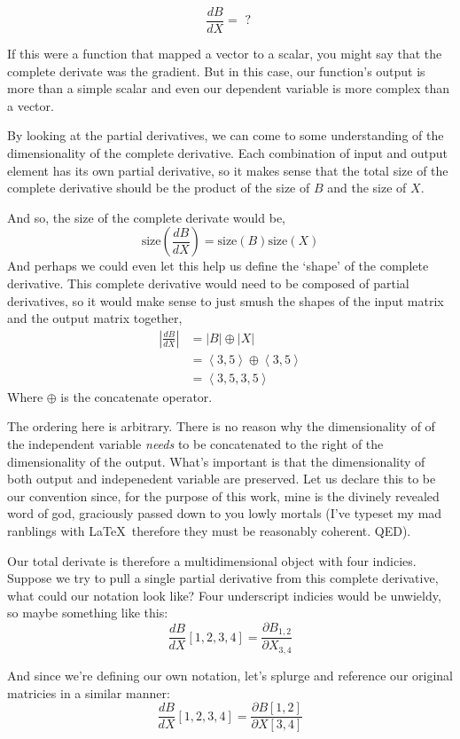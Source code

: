 \documentclass[12pt]{book}
\theoremstyle{definition}
\theoremstyle{plain}
\theoremstyle{ppart}
\theoremstyle{case}
\theoremstyle{solution}
\begin{document}
\[\frac{dB}{dX} = \mbox{ ? }\]

If this were a function that mapped a vector to a scalar, you might say that the
complete derivate was the gradient. But in this case, our function's output is more
than a simple scalar and even our dependent variable is more complex than a vector.

By looking at the partial derivatives, we can come to some understanding of the
dimensionality of the complete derivative. Each combination of input and output
element has its own partial derivative, so it makes sense that the total size
of the complete derivative should be the product of the size of $B$ and the size
of $X$.

And so, the size of the complete derivate would be,
\[
\mbox{size}\left(\frac{dB}{dX}\right) = \mbox{size}(B) \mbox{size}(X)
\]
And perhaps we could even let this help us define the `shape' of the complete
derivative. This complete derivative would need to be composed of partial
derivatives, so it would make sense to just smush the shapes of the input
matrix and the output matrix together,
\begin{align*}
\left|\frac{dB}{dX}\right| &= |B| \oplus |X| \\
 &= \left< 3, 5 \right> \oplus \left< 3, 5 \right> \\
 &= \left< 3, 5, 3, 5 \right>
\end{align*}
Where $\oplus$ is the concatenate operator.

The ordering here is arbitrary. There is no reason why the dimensionality of
of the independent variable \textit{needs} to be concatenated to the right of the
dimensionality of the output. What's important is that the dimensionality of
both output and indepenedent variable are preserved. Let us declare this to
be our convention since, for the purpose of this work, mine is the divinely revealed
word of god, graciously passed down to you lowly mortals (I've typeset
my mad ranblings with \LaTeX ~therefore they must be reasonably coherent. QED).

Our total derivate is therefore a multidimensional object with four indicies.
Suppose we try to pull a single partial derivative from this complete derivative,
what could our notation look like? Four underscript indicies would be unwieldy,
so maybe something like this:
\[
\frac{dB}{dX}[1,2,3,4] = \frac{\partial B_{1,2}}{\partial X_{3,4}}
\]

And since we're defining our own notation, let's splurge and reference our original
matricies in a similar manner:
\[
\frac{dB}{dX}[1,2,3,4] = \frac{\partial B[1,2]}{\partial X[3,4]}
\]
\end{document}
